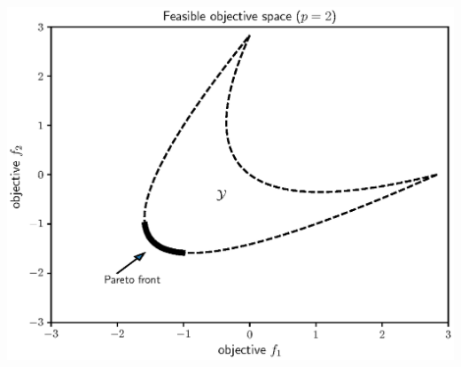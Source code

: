 \documentclass[aspectratio=169]{beamer}
\begin{document}
\begin{frame}
\begin{columns}
\begin{column}{.35\textwidth}
\includegraphics[width=\textwidth]{convex_pareto.eps}
\end{column}
\end{columns}
\end{frame}
\end{document}
